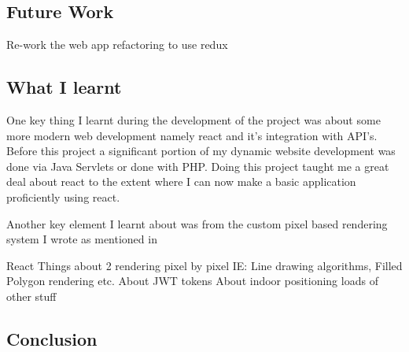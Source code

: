 \subsection{Future Work}
Re-work the web app refactoring to use redux

\subsection{What I learnt} %
One key thing I learnt during the development of the project was about some more modern web development namely react and it's integration with API's. Before this project a significant portion of my dynamic website development was done via Java Servlets or done with PHP. Doing this project taught me a great deal about react to the extent where I can now make a basic application proficiently using react.

Another key element I learnt about was from the custom pixel based rendering system I wrote as mentioned in \citetemp 

React
Things about 2 rendering pixel by pixel IE: Line drawing algorithms, Filled Polygon rendering etc.
About JWT tokens
About indoor positioning
loads of other stuff

\subsection{Conclusion}

